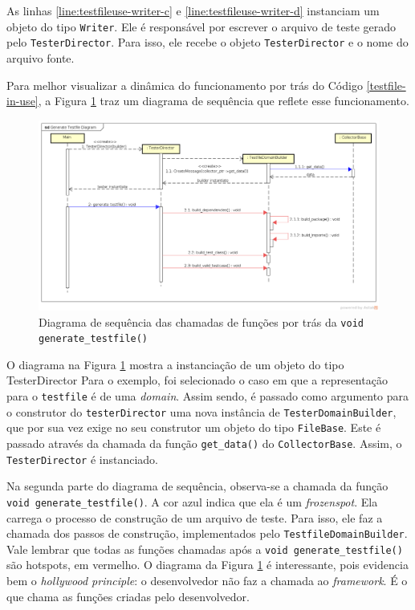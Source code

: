 As linhas \ref{line:testfileuse-writer-c} e \ref{line:testfileuse-writer-d}
instanciam um objeto do tipo \lstinline|Writer|. Ele é responsável por escrever
o arquivo de teste gerado pelo \lstinline|TesterDirector|. Para isso, ele
recebe o objeto \lstinline|TesterDirector| e o nome do arquivo fonte.

Para melhor visualizar a dinâmica do funcionamento por trás do Código
\ref{testfile-in-use}, a Figura \ref{generate-testfile-sequence-diagram}
traz um diagrama de sequência que reflete esse funcionamento.

\begin{landscape}
\begin{figure}[h]
  \centering
    \includegraphics[width=1.5\textwidth]{figuras/generate-testfile-sequence-diagram.png}
    \caption{Diagrama de sequência das chamadas de funções por trás da \lstinline|void generate_testfile()|}
    \label{generate-testfile-sequence-diagram}
\end{figure}
\FloatBarrier
\end{landscape}

O diagrama na Figura \ref{generate-testfile-sequence-diagram} mostra a instanciação
de um objeto do tipo \textsf{TesterDirector} Para o exemplo, foi selecionado
o caso em que a representação para o \lstinline|testfile| é de uma
\textit{domain}. Assim sendo, é passado como argumento para o construtor do
\lstinline|testerDirector| uma nova instância de \lstinline|TesterDomainBuilder|,
que por sua vez exige no seu construtor um objeto do tipo \lstinline|FileBase|.
Este é passado através da chamada da função \lstinline|get_data()| do
\lstinline|CollectorBase|. Assim, o \lstinline|TesterDirector| é instanciado.

Na segunda parte do diagrama de sequência, observa-se a chamada da função
\lstinline|void generate_testfile()|. A cor azul indica que ela é um
\textit{frozenspot}. Ela carrega o processo de construção de um
arquivo de teste. Para isso, ele faz a chamada dos passos de construção,
implementados pelo \lstinline|TestfileDomainBuilder|. Vale lembrar que
todas as funções chamadas após a \lstinline|void generate_testfile()| são
hotspots, em vermelho. O diagrama da Figura \ref{generate-testfile-sequence-diagram}
é interessante, pois evidencia bem o \textit{hollywood principle}: o
desenvolvedor não faz a chamada ao \textit{framework}. É o \framework que chama
as funções criadas pelo desenvolvedor.

